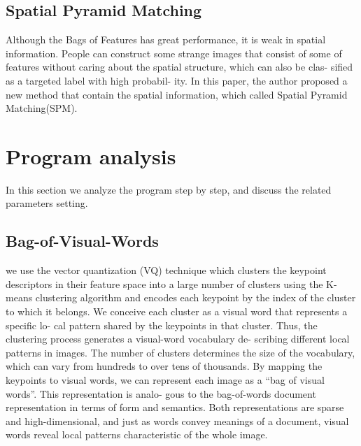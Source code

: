 \documentclass[10pt,twocolumn,letterpaper]{article}
\begin{document}
\subsection{Spatial Pyramid Matching}
Although the Bags of Features has great performance, it is weak in spatial information. People can construct some strange images that consist of some of features without caring about the spatial structure, which can also be clas- sified as a targeted label with high probabil- ity. In this paper, the author proposed a new method that contain the spatial information, which called Spatial Pyramid Matching(SPM).
 
\section{Program analysis}
In this section we analyze the program step by step, and discuss the related parameters setting.\\
\subsection{Bag-of-Visual-Words}
 \indent we use the vector quantization (VQ) technique which clusters the keypoint descriptors in their feature space into a large number of clusters using the K-means clustering algorithm and encodes each keypoint by the index of the cluster to which it belongs. We conceive each cluster as a visual word that represents a specific lo- cal pattern shared by the keypoints in that cluster. Thus, the clustering process generates a visual-word vocabulary de- scribing different local patterns in images. The number of clusters determines the size of the vocabulary, which can vary from hundreds to over tens of thousands. By mapping the keypoints to visual words, we can represent each image as a “bag of visual words”. This representation is analo- gous to the bag-of-words document representation in terms of form and semantics. Both representations are sparse and high-dimensional, and just as words convey meanings of a document, visual words reveal local patterns characteristic of the whole image.
\end{document}
